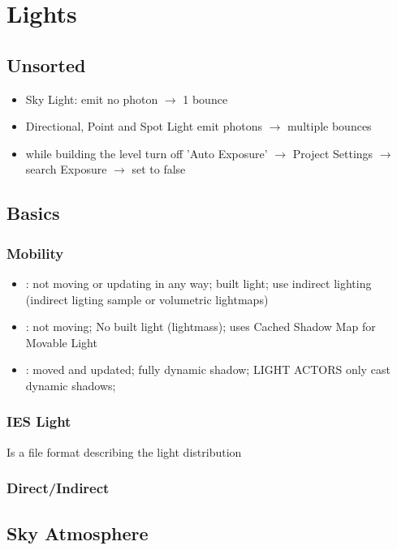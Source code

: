 \chapter{Lights}
    \section{Unsorted}
        \begin{itemize}
            \item Sky Light: emit no photon $\rightarrow$ 1 bounce
            \item Directional, Point and Spot Light emit photons $\rightarrow$ multiple bounces
            \item while building the level turn off 'Auto Exposure' $\rightarrow$ Project Settings $\rightarrow$ search Exposure $\rightarrow$ set to false
        \end{itemize}
    \section{Basics}
        \subsection{Mobility}
            \begin{itemize}
                \item {}: not  moving or updating in any way; built light; use indirect lighting (indirect ligting sample or volumetric lightmaps)
                \item {}: not moving; No built light (lightmass); uses Cached Shadow Map for Movable Light
                \item {}: moved and updated; fully dynamic shadow; LIGHT ACTORS only cast dynamic shadows;
            \end{itemize}
        
        \subsection{IES Light}
            Is a file format describing the light distribution \\

        \subsection{Direct/Indirect}

    \section{Sky Atmosphere}
